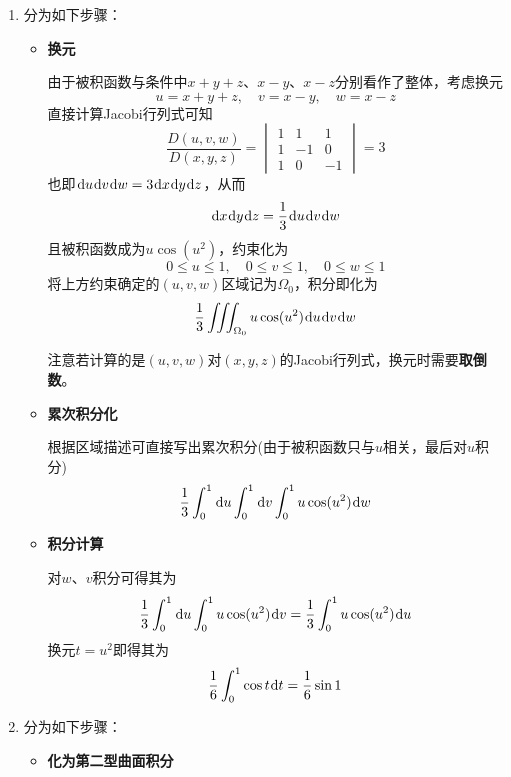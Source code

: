 \documentclass[a4paper,UTF8,fontset=windows,AutoFakeBold]{ctexart}
\newcommand*{\dr}{\hspace{0.07em}\mathrm{d}}
\newcommand*{\note}{\noindent *}
\theoremstyle{ex}
\begin{document}
\begin{enumerate}
\begin{itemize}
        利用重积分的几何意义可知$\iint_{D_x}\dr y\dr z$代表$D_x$的面积，而$D_x$可以改写为
        $$\frac{y^2}{2(1+x^2)}+\frac{z^2}{6(1+x^2)}\le1$$
        为长轴长$\sqrt{6(1+x^2)}$、短轴长$\sqrt{2(1+x^2)}$的椭圆，面积即为
        $$2\sqrt3(1+x^2)\pi$$
        从而积分可化为
        $$\int_0^12\sqrt3\pi x\dr x=\sqrt3\pi$$
    \end{itemize}
    
    \note 本题反射对称化简后也可直接\textbf{广义柱坐标换元}再进行累次积分化。

    \item 分为如下步骤：
    \begin{itemize}
        \item \textbf{换元}
        
        由于被积函数与条件中$x+y+z$、$x-y$、$x-z$分别看作了整体，考虑换元
        $$u=x+y+z,\quad v=x-y,\quad w=x-z$$
        直接计算Jacobi行列式可知
        $$\frac{D(u,v,w)}{D(x,y,z)}=\begin{vmatrix}1&1&1\\1&-1&0\\1&0&-1\end{vmatrix}=3$$
        也即$\dr u\dr v\dr w=3\dr x\dr y\dr z$，从而
        $$\dr x\dr y\dr z=\frac{1}{3}\dr u\dr v\dr w$$
        且被积函数成为$u\cos(u^2)$，约束化为
        $$0\le u\le1,\quad0\le v\le1,\quad0\le w\le1$$
        将上方约束确定的$(u,v,w)$区域记为$\Omega_0$，积分即化为
        $$\frac{1}{3}\iiint_{\Omega_0}u\cos(u^2)\dr u\dr v\dr w$$

        \note 注意若计算的是$(u,v,w)$对$(x,y,z)$的Jacobi行列式，换元时需要\textbf{取倒数}。

        \item \textbf{累次积分化}
        
        根据区域描述可直接写出累次积分(由于被积函数只与$u$相关，最后对$u$积分)
        $$\frac{1}{3}\int_0^1\dr u\int_0^1\dr v\int_0^1u\cos(u^2)\dr w$$

        \item \textbf{积分计算}
        
        对$w$、$v$积分可得其为
        $$\frac{1}{3}\int_0^1\dr u\int_0^1u\cos(u^2)\dr v=\frac{1}{3}\int_0^1u\cos(u^2)\dr u$$
        换元$t=u^2$即得其为
        $$\frac{1}{6}\int_0^1\cos t\dr t=\frac{1}{6}\sin 1$$
    \end{itemize}

    \item 分为如下步骤：
    \begin{itemize}
        \item \textbf{化为第二型曲面积分}
        

\end{itemize}
\end{enumerate}
\end{document}
